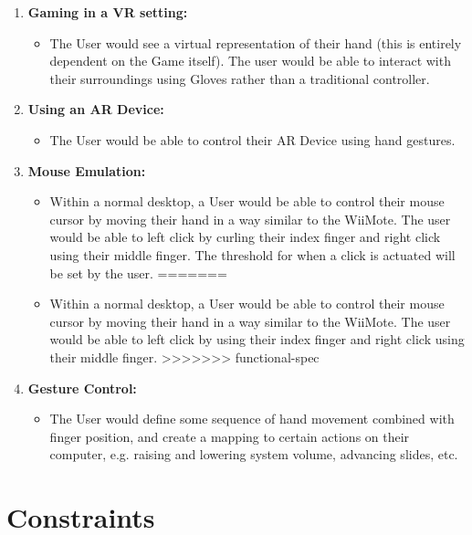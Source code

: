 \documentclass[12pt,a4paper,oneside]{book}
\theoremstyle{plain}
\numberwithin{equation}{chapter}
\newcounter{Secnum}
\begin{document}
\begin{enumerate}
\item \textbf{Gaming in a VR setting:}
\begin{itemize}
    \item The User would see a virtual representation of their hand (this is entirely dependent on the Game itself). The user would be able to interact with their surroundings using Gloves rather than a traditional controller.
\end{itemize}

\item \textbf{Using an AR Device:}
\begin{itemize}
    \item The User would be able to control their AR Device using hand gestures.
\end{itemize}


\item \textbf{Mouse Emulation:}
\begin{itemize}
<<<<<<< HEAD
    \item Within a normal desktop, a User would be able to control their mouse cursor by moving their hand in a way similar to the WiiMote. The user would be able to left click by curling their index finger and right click using their middle finger. The threshold for when a click is actuated will be set by the user.
=======
    \item Within a normal desktop, a User would be able to control their mouse cursor by moving their hand in a way similar to the WiiMote. The user would be able to left click by using their index finger and right click using their middle finger.
>>>>>>> functional-spec
\end{itemize}


\item \textbf{Gesture Control:}
\begin{itemize}
    \item The User would define some sequence of hand movement combined with finger position, and create a mapping to certain actions on their computer, e.g. raising and lowering system volume, advancing slides, etc.
\end{itemize}

\end{enumerate}

\section{Constraints}
\end{document}
